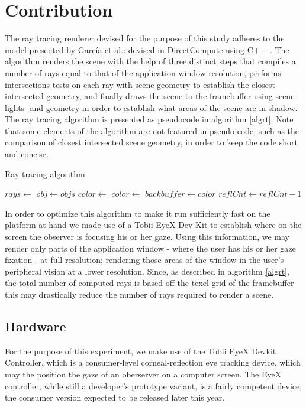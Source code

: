 
\section{Contribution}
The ray tracing renderer devised for the purpose of this study adheres to the model presented by Garc{\'i}a et al.: devised in DirectCompute using C$++$.
The algorithm renders the scene with the help of three distinct steps that compiles a number of rays equal to that of the application window resolution, performs intersections tests on each ray with scene geometry to establish the closest intersected geometry, and finally draws the scene to the framebuffer using scene lights- and geometry in order to establish what areas of the scene are in shadow.
The ray tracing algorithm is presented as pseudocode in algorithm \ref{algrt}.
Note that some elements of the algorithm are not featured in-pseudo-code, such as the comparison of closest intersected scene geometry, in order to keep the code short and concise.

\begin{algorithm}
\begin{algorithmic}[1]
\caption{Ray tracing algorithm}\label{algrt}
\State $rays\gets$
    \State $obj\gets objs$
\EndIf
\State $color\gets$
\State $color\gets$
\EndFor
\State $backbuffer\gets color$
\EndFor
\State $reflCnt\gets reflCnt - 1$
\EndWhile
\EndProcedure
\end{algorithmic}
\end{algorithm}

In order to optimize this algorithm to make it run sufficiently fast on the platform at hand we made use of a Tobii EyeX Dev Kit to establish where on the screen the observer is focusing his or her gaze.
Using this information, we may render only parts of the application window - where the user has his or her gaze fixation - at full resolution; rendering those areas of the window in the user's peripheral vision at a lower resolution.
Since, as described in algorithm \ref{algrt}, the total number of computed rays is based off the texel grid of the framebuffer this may drastically reduce the number of rays required to render a scene.

\subsection{Hardware}
For the purpose of this experiment, we make use of the Tobii EyeX Devkit Controller, which is a consumer-level corneal-reflection eye tracking device, which may the position the gaze of an oberserver on a computer screen.
The EyeX controller, while still a developer's prototype variant, is a fairly competent device; the consumer version expected to be released later this year.

